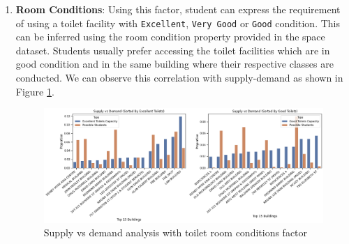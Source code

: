 \begin{enumerate}
    \item \textbf{Room Conditions}: Using this factor, student can express the requirement of using a toilet facility with \texttt{Excellent}, \texttt{Very Good} or \texttt{Good} condition. This can be inferred using the room condition property provided in the space dataset. Students usually prefer accessing the toilet facilities which are in good condition and in the same building where their respective classes are conducted. We can observe this correlation with supply-demand as shown in Figure \ref{toilet}.
    
    \begin{figure}[H]
    \centering
    \includegraphics[width=15cm]{resources/images/snap-10.png}
    \caption{Supply vs demand analysis with toilet room conditions factor}
    \label{toilet}
\end{figure}

    
\end{enumerate}
